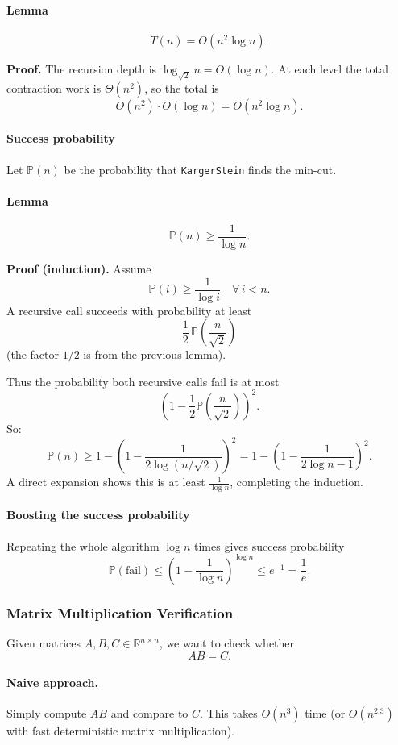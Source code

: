 \documentclass{article}
\begin{document}
\paragraph{Lemma}
\[
T(n) = O(n^{2} \log n).
\]

\textbf{Proof.}
The recursion depth is $\log_{\sqrt{2}} n = O(\log n)$.
At each level the total contraction work is $\Theta(n^{2})$, so the total is
\[
O(n^{2}) \cdot O(\log n) = O(n^{2}\log n).
\]

\paragraph{Success probability}
Let $\mathbb{P}(n)$ be the probability that \texttt{KargerStein} finds the min-cut.

\paragraph{Lemma}
\[
\mathbb{P}(n) \ge \frac{1}{\log n}.
\]

\textbf{Proof (induction).}
Assume 
\[
\mathbb{P}(i) \ge \frac{1}{\log i}
\quad\forall\, i<n.
\]
A recursive call succeeds with probability at least
\[
\frac{1}{2}\,\mathbb{P}\!\left(\frac{n}{\sqrt{2}}\right)
\]
(the factor $1/2$ is from the previous lemma).

Thus the probability both recursive calls fail is at most
\[
\left(1 - \frac{1}{2}\mathbb{P}\!\left(\frac{n}{\sqrt{2}}\right)\right)^{2}.
\]
So:
\[
\mathbb{P}(n)
\ge 1 - \left(1 - \frac{1}{2\log(n/\sqrt{2})}\right)^{2}
= 1 - \left(1 - \frac{1}{2\log n - 1}\right)^{2}.
\]
A direct expansion shows this is at least $\frac{1}{\log n}$, completing the induction.

\paragraph{Boosting the success probability}
Repeating the whole algorithm $\log n$ times gives success probability
\[
\mathbb{P}(\text{fail}) 
\le \left(1 - \frac{1}{\log n}\right)^{\log n}
\le e^{-1}
= \frac{1}{e}.
\]

\subsubsection{Matrix Multiplication Verification}

Given matrices $A,B,C \in \mathbb{R}^{n \times n}$, we want to check whether
\[
AB = C.
\]

\paragraph{Naive approach.}  
Simply compute $AB$ and compare to $C$.  
This takes $O(n^{3})$ time (or $O(n^{2.3})$ with fast deterministic matrix multiplication).
\end{document}
